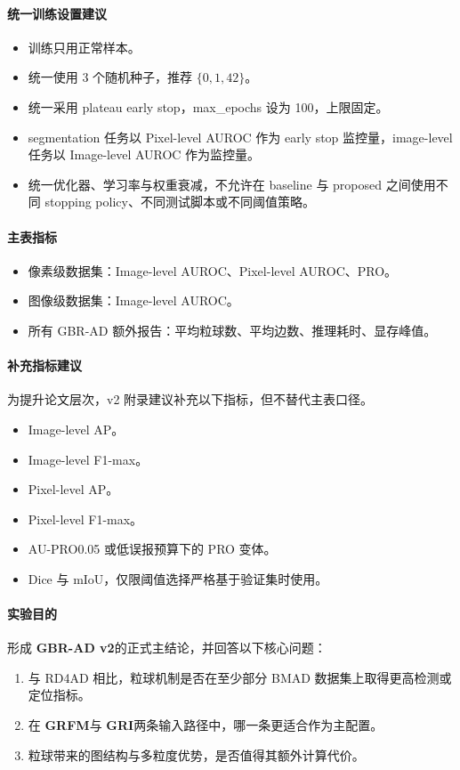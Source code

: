 \documentclass[UTF8,a4paper]{ctexart}
\newcommand{\gri}{\textbf{GRI}}
\newcommand{\grfm}{\textbf{GRFM}}
\newcommand{\gbrvtwo}{\textbf{GBR-AD v2}}
\begin{document}
\paragraph{统一训练设置建议}
\begin{itemize}
  \item 训练只用正常样本。
  \item 统一使用 3 个随机种子，推荐 $\{0,1,42\}$。
  \item 统一采用 plateau early stop，max\_epochs 设为 100，上限固定。
  \item segmentation 任务以 Pixel-level AUROC 作为 early stop 监控量，image-level 任务以 Image-level AUROC 作为监控量。
  \item 统一优化器、学习率与权重衰减，不允许在 baseline 与 proposed 之间使用不同 stopping policy、不同测试脚本或不同阈值策略。
\end{itemize}

\paragraph{主表指标}
\begin{itemize}
  \item 像素级数据集：Image-level AUROC、Pixel-level AUROC、PRO。
  \item 图像级数据集：Image-level AUROC。
  \item 所有 GBR-AD 额外报告：平均粒球数、平均边数、推理耗时、显存峰值。
\end{itemize}

\paragraph{补充指标建议}
为提升论文层次，v2 附录建议补充以下指标，但不替代主表口径。
\begin{itemize}
  \item Image-level AP。
  \item Image-level F1-max。
  \item Pixel-level AP。
  \item Pixel-level F1-max。
  \item AU-PRO0.05 或低误报预算下的 PRO 变体。
  \item Dice 与 mIoU，仅限阈值选择严格基于验证集时使用。
\end{itemize}

\paragraph{实验目的}
形成 \gbrvtwo 的正式主结论，并回答以下核心问题：
\begin{enumerate}
  \item 与 RD4AD 相比，粒球机制是否在至少部分 BMAD 数据集上取得更高检测或定位指标。
  \item 在 \grfm 与 \gri 两条输入路径中，哪一条更适合作为主配置。
  \item 粒球带来的图结构与多粒度优势，是否值得其额外计算代价。
\end{enumerate}
\end{document}
